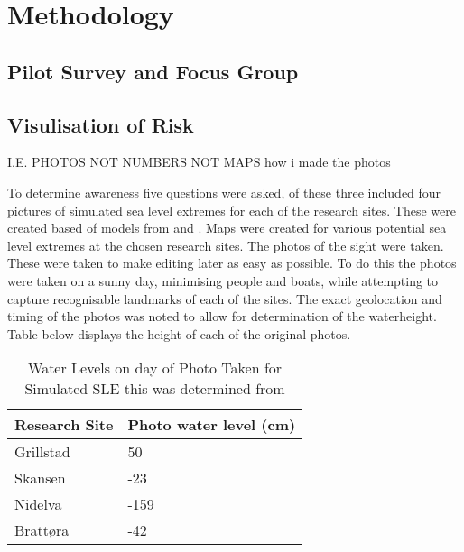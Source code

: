


\chapter{Methodology}
\section{Pilot Survey and Focus Group}

\section{Visulisation of Risk}
I.E. PHOTOS NOT NUMBERS NOT MAPS 
how i made the photos

To determine awareness five questions were asked, of these three included four pictures of simulated sea level extremes for each of the research sites. These were created based of models from \cite{noauthor_se_2021} \cite{noauthor_integrating-sea-level-rise-and-storm-surges--local-planningpdf_2017} and \cite{noauthor_stormflo_2021}. Maps were created for various potential sea level extremes at the chosen research sites. The photos of the sight were taken. These were taken to make editing later as easy as possible. To do this the photos were taken on a sunny day, minimising people and boats, while attempting to capture recognisable landmarks of each of the sites. The exact geolocation and timing of the photos was noted to allow for determination of the waterheight. Table below displays the height of each of the original photos. 

\begin{table}[h]
    \centering
    \begin{tabular}{|l|l|}
        \hline
     	Research Site & Photo water level (cm) \\ \hline
            Grillstad & 50 \\ \hline
            Skansen & -23 \\ \hline
            Nidelva & -159 \\ \hline
            Brattøra	& -42 \\ \hline
    \end{tabular}
    \caption{Water Levels on day of Photo Taken for Simulated SLE this was determined from \cite{tides_high_2022}}
    \label{tab:water_level_photo}
\end{table}



